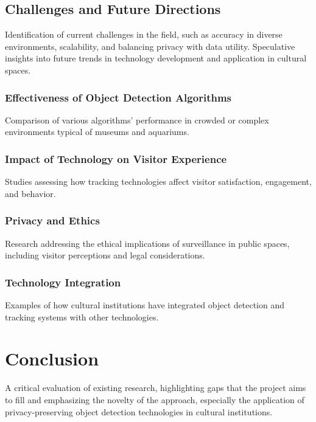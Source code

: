 \subsection{Challenges and Future Directions}
Identification of current challenges in the field, such as accuracy in diverse environments, scalability, and balancing privacy with data utility.
Speculative insights into future trends in technology development and application in cultural spaces.

\subsubsection{Effectiveness of Object Detection Algorithms}
Comparison of various algorithms' performance in crowded or complex environments typical of museums and aquariums.

\subsubsection{Impact of Technology on Visitor Experience}
Studies assessing how tracking technologies affect visitor satisfaction, engagement, and behavior.

\subsubsection{Privacy and Ethics}
Research addressing the ethical implications of surveillance in public spaces, including visitor perceptions and legal considerations.

\subsubsection{Technology Integration}
Examples of how cultural institutions have integrated object detection and tracking systems with other technologies.

\section{Conclusion}
A critical evaluation of existing research, highlighting gaps that the project aims to fill and emphasizing the novelty of the approach, especially the application of privacy-preserving object detection technologies in cultural institutions.
